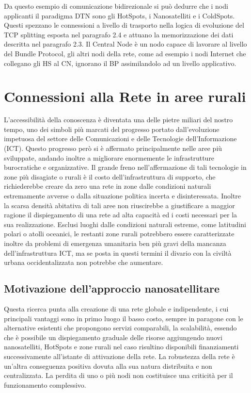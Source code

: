 \documentclass[12pt,a4paper,oneside]{book}
\begin{document}
		Da questo esempio di comunicazione bidirezionale si può dedurre che i nodi applicanti il paradigma DTN sono gli HotSpots, i Nanosatelliti e i ColdSpots. Questi spezzano le connessioni a livello di trasporto nella logica di evoluzione del TCP splitting esposta nel paragrafo 2.4 e attuano la memorizzazione dei dati descritta nel paragrafo 2.3. Il Central Node è un nodo capace di lavorare al livello del Bundle Protocol, gli altri nodi della rete, come ad esempio i nodi Internet che collegano gli HS al CN, ignorano il BP assimilandolo ad un livello applicativo. 
	
		
		\section{Connessioni alla Rete in aree rurali}
			
		L'accessibilità della conoscenza è diventata una delle pietre miliari del nostro tempo, uno dei simboli più marcati del progresso portato dall'evoluzione impetuosa del settore delle Comunicazioni e delle Tecnologie dell'Informazione (ICT). Questo progresso però si è affermato principalmente nelle aree più sviluppate, andando inoltre a migliorare enormemente le infrastrutture burocratiche e organizzative. Il grande freno nell'affermazione di tali tecnologie in zone più disagiate o rurali è il costo dell'infrastruttura di supporto, che richiederebbe creare da zero una rete in zone dalle condizioni naturali estremamente avverse o dalla situazione politica incerta e disinteressata. Inoltre la scarsa densità abitativa di tali aree non riuscirebbe a giustificare a maggior ragione il dispiegamento di una rete ad alta capacità ed i costi necessari per la sua realizzazione. Esclusi luoghi dalle condizioni naturali estreme, come latitudini polari o atolli oceanici, le restanti zone rurali potrebbero essere caratterizzate inoltre da problemi di emergenza umanitaria ben più gravi della mancanza dell'infrastruttura ICT, ma se posta in questi termini il divario con la civiltà urbana occidentalizzata non potrebbe che aumentare.
		
			\subsection{Motivazione dell'approccio nanosatellitare}			
				
			Questa ricerca punta alla creazione di una rete globale e indipendente, i cui principali vantaggi sono in primo luogo il basso costo, sempre in paragone con le alternative esistenti che propongono servizi comparabili, la scalabilità, essendo che è possibile un dispiegamento graduale delle risorse aggiungendo nuovi nanosatelliti, HotSpots e zone rurali nel caso risultino disponibili finanziamenti successivamente all'istante di attivazione della rete. La robustezza della rete è un'altra conseguenza positiva dovuta alla sua natura distribuita e non centralizzata. La perdita di uno o più nodi non costituisce una criticità per il funzionamento complessivo. 
				
\end{document}
